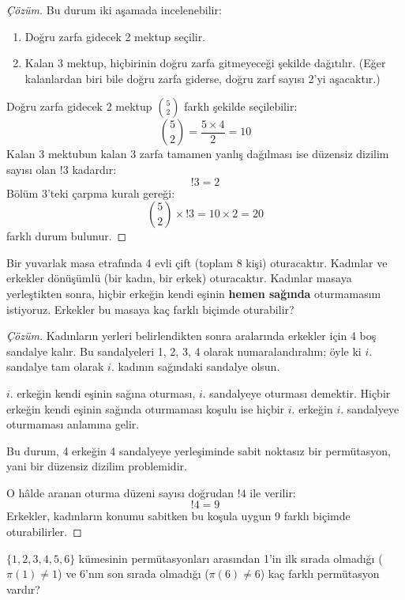 \begin{proof}[Çözüm]
Bu durum iki aşamada incelenebilir: \begin{enumerate} \item Doğru zarfa gidecek
2 mektup seçilir. \item Kalan 3 mektup, hiçbirinin doğru zarfa gitmeyeceği
şekilde dağıtılır. (Eğer kalanlardan biri bile doğru zarfa giderse, doğru zarf
sayısı 2'yi aşacaktır.) \end{enumerate}

Doğru zarfa gidecek 2 mektup $\binom{5}{2}$ farklı şekilde seçilebilir: \[
\binom{5}{2} = \frac{5 \times 4}{2} = 10 \] Kalan 3 mektubun kalan 3 zarfa
tamamen yanlış dağılması ise düzensiz dizilim sayısı olan $!3$ kadardır: \[ !3 = 2
\] Bölüm 3'teki çarpma kuralı gereği: \[ \binom{5}{2} \times !3 = 10 \times 2 = 20
\] farklı durum bulunur. \end{proof}

\begin{example} Bir yuvarlak masa etrafında 4 evli çift (toplam 8 kişi)
oturacaktır. Kadınlar ve erkekler dönüşümlü (bir kadın, bir erkek) oturacaktır.
Kadınlar masaya yerleştikten sonra, hiçbir erkeğin kendi eşinin \textbf{hemen
sağında} oturmamasını istiyoruz. Erkekler bu masaya kaç farklı biçimde
oturabilir? \end{example}

\begin{proof}[Çözüm]
Kadınların yerleri belirlendikten sonra aralarında erkekler için 4 boş sandalye
kalır. Bu sandalyeleri 1, 2, 3, 4 olarak numaralandıralım; öyle ki $i$. sandalye
tam olarak $i$. kadının sağındaki sandalye olsun.

$i$. erkeğin kendi eşinin sağına oturması, $i$. sandalyeye oturması demektir.
Hiçbir erkeğin kendi eşinin sağında oturmaması koşulu ise hiçbir $i$. erkeğin $i$.
sandalyeye oturmaması anlamına gelir.

Bu durum, 4 erkeğin 4 sandalyeye yerleşiminde sabit noktasız bir permütasyon,
yani bir düzensiz dizilim problemidir.

O hâlde aranan oturma düzeni sayısı doğrudan $!4$ ile verilir: \[ !4 = 9 \]
Erkekler, kadınların konumu sabitken bu koşula uygun 9 farklı biçimde
oturabilirler. \end{proof}

\begin{example} $\{1, 2, 3, 4, 5, 6\}$ kümesinin permütasyonları arasından 1'in
ilk sırada olmadığı ($\pi(1) \ne 1$) ve 6'nın son sırada olmadığı ($\pi(6) \ne 6$)
kaç farklı permütasyon vardır? \end{example}

